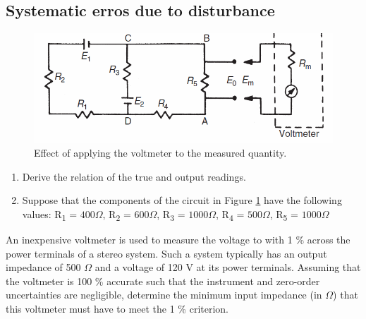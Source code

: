 \documentclass[a4paper,11pt,dvipsnames]{book}
\begin{document}
\subsection*{Systematic erros due to disturbance}
\begin{question}[subtitle=System Disturbance]
\begin{figure}[h!]\label{fig:systematic_error_circuit}
\centering
  \includegraphics[width=0.8\linewidth]{systematic_error_circuit}
  \caption{Effect of applying the voltmeter to the measured quantity.} 
\end{figure}
\begin{enumerate}
\item Derive the relation of the true and output readings.
\item Suppose that the components of the circuit in Figure \ref{fig:systematic_error_circuit} have the following values:
 R\textsubscript{1} = $400\Omega$, R\textsubscript{2} = $600\Omega$, R\textsubscript{3} = $1000\Omega$, R\textsubscript{4} = $500\Omega$, R\textsubscript{5} = $1000\Omega$
\end{enumerate}
\examspace*{15em}

\end{question}
\begin{solution}


\end{solution}


\begin{question}
An inexpensive voltmeter is used to measure the voltage to with 1 \%
across the power terminals of a stereo system. Such a system typically has
an output impedance of 500 $\Omega$ and a voltage of 120 V at its power terminals.
Assuming that the voltmeter is 100 \% accurate such that the instrument and
zero-order uncertainties are negligible, determine the minimum input impedance
(in $\Omega$) that this voltmeter must have to meet the 1 \% criterion.

\examspace*{15em}

\end{question}
\begin{solution}


\end{solution}
\end{document}

